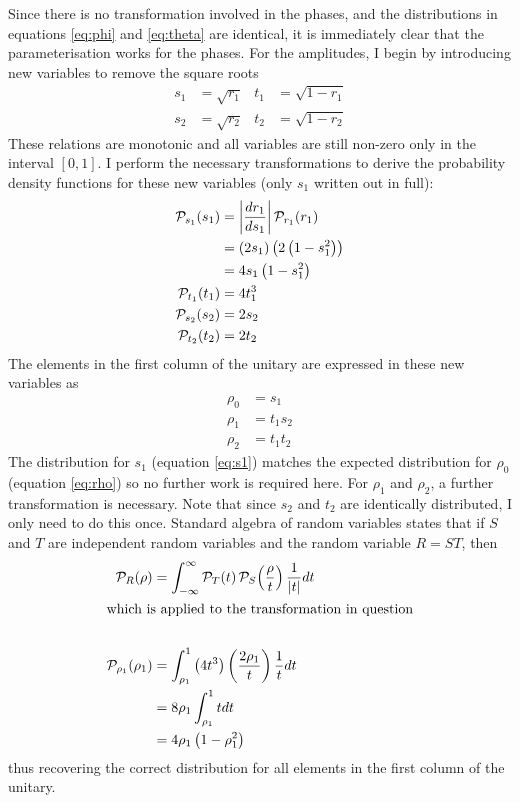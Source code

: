 \documentclass[a4paper,11pt]{article}
\begin{document}
Since there is no transformation involved in the phases, and the distributions
in equations \ref{eq:phi} and \ref{eq:theta} are identical, it is immediately
clear that the parameterisation works for the phases. For the amplitudes, I
begin by introducing new variables to remove the square roots
\begin{align}
  s_{1} &= \sqrt{r_{1}} & t_{1} &= \sqrt{1-r_{1}} \\
  s_{2} &= \sqrt{r_{2}} & t_{2} &= \sqrt{1-r_{2}}
\end{align}
These relations are monotonic and all variables are still non-zero only in the
interval \(\left[ 0,1 \right]\). I perform the necessary transformations to
derive the probability density functions for these new variables (only \(s_{1}\)
written out in full):
\begin{align}
  \mathcal{P}_{s_{1}} \!\left(s_{1}\right) &= \left| \frac{dr_{1}}{ds_{1}} \right|
    \mathcal{P}_{r_{1}} \!\left(r_{1}\right) \\
  &= \left( 2s_{1} \right) \left( 2 \left( 1-s_{1}^{2} \right) \right) \\
  \label{eq:s1}
  &= 4 s_{1} \left( 1-s_{1}^{2} \right) \\
  \label{eq:t1}
  \mathcal{P}_{t_{1}} \!\left(t_{1}\right) &= 4 t_{1}^{3} \\
  \label{eq:s2}
  \mathcal{P}_{s_{2}} \!\left(s_{2}\right) &= 2 s_{2} \\
  \label{eq:t2}
  \mathcal{P}_{t_{2}} \!\left(t_{2}\right) &= 2 t_{2}
\end{align}
The elements in the first column of the unitary are expressed in these new
variables as
\begin{align}
  \rho_{0} &= s_{1} \\
  \rho_{1} &= t_{1} s_{2} \\
  \rho_{2} &= t_{1} t_{2}
\end{align}
The distribution for \(s_{1}\) (equation \ref{eq:s1}) matches the expected
distribution for \(\rho_{0}\) (equation \ref{eq:rho}) so no further work is
required here. For \(\rho_{1}\) and \(\rho_{2}\), a further transformation is
necessary. Note that since \(s_{2}\) and \(t_{2}\) are identically distributed,
I only need to do this once. Standard algebra of random variables states that if
\(S\) and \(T\) are independent random variables and the random variable \(R =
ST\), then
\begin{align}
  \mathcal{P}_{R} \!\left(\rho\right) &= \int_{-\infty}^{\infty} \mathcal{P}_{T} \!\left(t\right)
    \mathcal{P}_{S} \!\left(\frac{\rho}{t}\right) \frac{1}{\left|t\right|} dt \\
  \intertext{which is applied to the transformation in question} \\
  \mathcal{P}_{\rho_{1}} \!\left(\rho_{1}\right) &= \int_{\rho_{1}}^{1} \left( 4 t^{3} \right)
    \left( \frac{2 \rho_{1}}{t} \right) \frac{1}{t} dt \\
  &= 8 \rho_{1} \int_{\rho_{1}}^{1} t dt \\
  &= 4 \rho_{1} \left( 1-\rho_{1}^{2} \right)
\end{align}
thus recovering the correct distribution for all elements in the first column of
the unitary.
\end{document}
